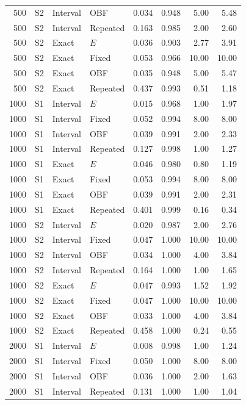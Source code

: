 \documentclass[12pt]{article}
\theoremstyle{definition}
\theoremstyle{remark}
\begin{document}
\begin{longtable}{rcllrrrr}
500 & S2 & Interval & OBF & 0.034 & 0.948 & 5.00 & 5.48 \\
500 & S2 & Interval & Repeated & 0.163 & 0.985 & 2.00 & 2.60 \\
500 & S2 & Exact & $E$ & 0.036 & 0.903 & 2.77 & 3.91 \\
500 & S2 & Exact & Fixed & 0.053 & 0.966 & 10.00 & 10.00 \\
500 & S2 & Exact & OBF & 0.035 & 0.948 & 5.00 & 5.47 \\
500 & S2 & Exact & Repeated & 0.437 & 0.993 & 0.51 & 1.18 \\
1000 & S1 & Interval & $E$ & 0.015 & 0.968 & 1.00 & 1.97 \\
1000 & S1 & Interval & Fixed & 0.052 & 0.994 & 8.00 & 8.00 \\
1000 & S1 & Interval & OBF & 0.039 & 0.991 & 2.00 & 2.33 \\
1000 & S1 & Interval & Repeated & 0.127 & 0.998 & 1.00 & 1.27 \\
1000 & S1 & Exact & $E$ & 0.046 & 0.980 & 0.80 & 1.19 \\
1000 & S1 & Exact & Fixed & 0.053 & 0.994 & 8.00 & 8.00 \\
1000 & S1 & Exact & OBF & 0.039 & 0.991 & 2.00 & 2.31 \\
1000 & S1 & Exact & Repeated & 0.401 & 0.999 & 0.16 & 0.34 \\
1000 & S2 & Interval & $E$ & 0.020 & 0.987 & 2.00 & 2.76 \\
1000 & S2 & Interval & Fixed & 0.047 & 1.000 & 10.00 & 10.00 \\
1000 & S2 & Interval & OBF & 0.034 & 1.000 & 4.00 & 3.84 \\
1000 & S2 & Interval & Repeated & 0.164 & 1.000 & 1.00 & 1.65 \\
1000 & S2 & Exact & $E$ & 0.047 & 0.993 & 1.52 & 1.92 \\
1000 & S2 & Exact & Fixed & 0.047 & 1.000 & 10.00 & 10.00 \\
1000 & S2 & Exact & OBF & 0.033 & 1.000 & 4.00 & 3.84 \\
1000 & S2 & Exact & Repeated & 0.458 & 1.000 & 0.24 & 0.55 \\
2000 & S1 & Interval & $E$ & 0.008 & 0.998 & 1.00 & 1.24 \\
2000 & S1 & Interval & Fixed & 0.050 & 1.000 & 8.00 & 8.00 \\
2000 & S1 & Interval & OBF & 0.036 & 1.000 & 2.00 & 1.63 \\
2000 & S1 & Interval & Repeated & 0.131 & 1.000 & 1.00 & 1.04 \\

\end{longtable}
\end{document}
